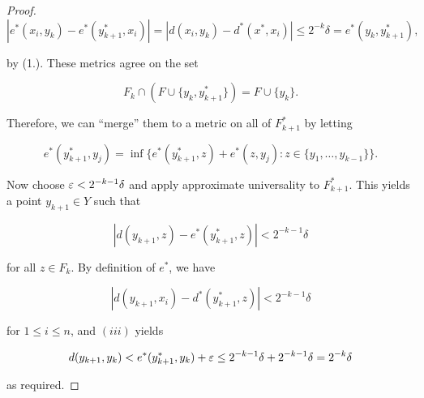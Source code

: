 \begin{proof}
\begin{equation}
|e^*(x_i,y_k) - e^*(y^*_{k+1},x_i)| = |d(x_i,y_k) - d^*(x^*,x_i) | \leq 2^{-k}\delta = e^*(y_k, y^*_{k+1}),
\end{equation}

by (1.). These metrics agree on the set

\begin{equation}
F_k \cap (F \cup \{y_k,y^*_{k+1}\}) = F \cup \{y_k\}.
\end{equation}

Therefore, we can ``merge'' them to a metric on all of $F^*_{k+1}$ by letting

\begin{equation}
e^*(y^*_{k+1}, y_j) = \inf \{e^*(y^*_{k+1}, z) + e^*(z,y_j) \colon z \in \{y_1, \dots, y_{k-1}\} \}.
\end{equation}

Now choose $\varepsilon < 2^{ -k -1}\delta$ and apply approximate universality to $F^*_{k+1}$. This yields a point $y_{k+1} \in Y$ such that

\begin{equation}
|d(y_{k+1}, z)  - e^*(y^*_{k+1}, z) | < 2^{-k-1}\delta
\end{equation}

for all $z \in F_k$. By definition of $e^*$, we have

\begin{equation}
|d(y_{k+1}, x_i)  - d^*(y^*_{k+1}, z) | < 2^{-k-1}\delta
\end{equation}

for $1 \leq i \leq n$, and $(iii)$ yields

\begin{equation}
d(y_{k+1}, y_k) < e^*(y^*_{k+1},y_k) + \varepsilon \leq 2^{-k-1}\delta + 2^{-k-1}\delta = 2^{-k}\delta
\end{equation}

as required.

\end{proof}